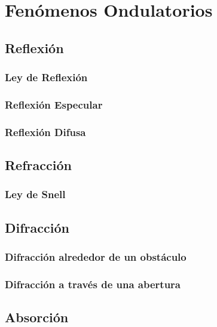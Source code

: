 \chapter{Fenómenos Ondulatorios}%
\section{Reflexión}%

\subsection{Ley de Reflexión}

\subsection{Reflexión Especular}

\subsection{Reflexión Difusa}

\section{Refracción}

\subsection{Ley de Snell}

\section{Difracción}

\subsection{Difracción alrededor de un obstáculo}

\subsection{Difracción a través de una abertura}

\section{Absorción}

